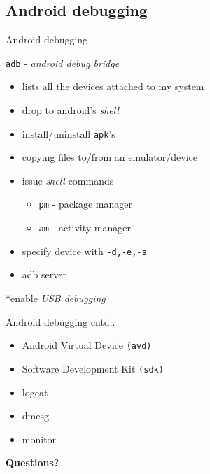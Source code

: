 \documentclass{beamer}
\begin{document}
 \subsection{Android debugging}
 \begin{frame}{Android debugging}
   \begin{block}{{\tt adb} - {\em android debug bridge}}
     \begin{itemize} \pause
       \item lists all the devices attached to my system\pause
       \item drop to android's {\em shell} \pause
       \item install/uninstall {\tt apk}'s \pause
       \item copying files to/from an emulator/device \pause
       \item issue {\em shell} commands \pause
         \begin{itemize}
         \item {\tt pm} - package manager 
         \item {\tt am} - activity manager
         \end{itemize} \pause
       \item specify device with {\tt -d,-e,-s} \pause
       \item adb server
     \end{itemize}
   \end{block}
   \pause
   *enable {\em USB debugging}
 \end{frame}

 \begin{frame}{Android debugging cntd..}
   \begin{block}{}
     \begin{itemize}
       \item Android Virtual Device {\tt (avd)}
       \item Software Development Kit {\tt (sdk)}
       \item logcat
       \item dmesg
       \item monitor
     \end{itemize}
   \end{block}
 \end{frame}

\begin{frame}{}
  \centerline{\bf Questions?}
\end{frame}
\end{document}
